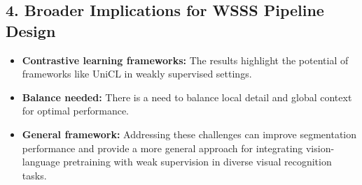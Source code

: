 \subsection*{4. Broader Implications for WSSS Pipeline Design}
\begin{itemize}
	\item \textbf{Contrastive learning frameworks:} The results highlight the potential of frameworks like UniCL in weakly supervised settings.
	\item \textbf{Balance needed:} There is a need to balance local detail and global context for optimal performance.
	\item \textbf{General framework:} Addressing these challenges can improve segmentation performance and provide a more general approach for integrating vision-language pretraining with weak supervision in diverse visual recognition tasks.
\end{itemize}

